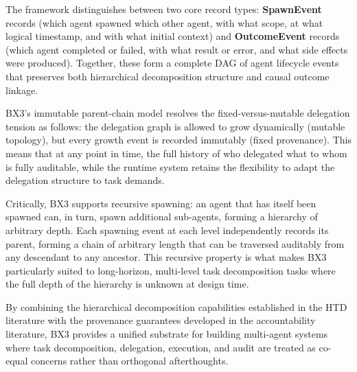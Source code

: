 The framework distinguishes between two core record types: \textbf{SpawnEvent} records (which agent spawned which other agent, with what scope, at what logical timestamp, and with what initial context) and \textbf{OutcomeEvent} records (which agent completed or failed, with what result or error, and what side effects were produced). Together, these form a complete DAG of agent lifecycle events that preserves both hierarchical decomposition structure and causal outcome linkage.

BX3's immutable parent-chain model resolves the fixed-versus-mutable delegation tension as follows: the delegation graph is allowed to grow dynamically (mutable topology), but every growth event is recorded immutably (fixed provenance). This means that at any point in time, the full history of who delegated what to whom is fully auditable, while the runtime system retains the flexibility to adapt the delegation structure to task demands.

Critically, BX3 supports recursive spawning: an agent that has itself been spawned can, in turn, spawn additional sub-agents, forming a hierarchy of arbitrary depth. Each spawning event at each level independently records its parent, forming a chain of arbitrary length that can be traversed auditably from any descendant to any ancestor. This recursive property is what makes BX3 particularly suited to long-horizon, multi-level task decomposition tasks where the full depth of the hierarchy is unknown at design time.

By combining the hierarchical decomposition capabilities established in the HTD literature with the provenance guarantees developed in the accountability literature, BX3 provides a unified substrate for building multi-agent systems where task decomposition, delegation, execution, and audit are treated as co-equal concerns rather than orthogonal afterthoughts.

